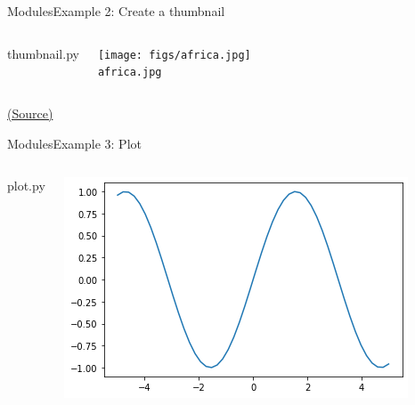\documentclass[10pt,compress]{beamer} %
\begin{document}
\begin{frame}[plain]{Modules}{Example 2: Create a thumbnail}
	\begin{columns}

		\vspace{-0.2cm}
		\begin{exampleblock}{thumbnail.py}
		\vspace{-0.2cm}
		
		\vspace{-0.2cm}
		\end{exampleblock}

		\vspace{-0.2cm}
		\centering \texttt{[image: figs/africa.jpg]}\\
	 	\texttt{africa.jpg}
	\end{columns}
		\vspace{-0.2cm}
	\centering \tiny{\href{http://www.pythonforbeginners.com/gui/how-to-use-pillow}{(Source)}}
\end{frame}

\begin{frame}{Modules}{Example 3: Plot}
	\begin{columns}
 	   \column{.60\textwidth}

		\vspace{-0.2cm}
		\begin{exampleblock}{plot.py}
		\vspace{-0.2cm}
		
		\vspace{-0.2cm}
		\end{exampleblock}

  		\column{.50\textwidth}
		\vspace{-0.2cm}
		\centering \includegraphics[width=\linewidth]{figs/plot.png}\\
	\end{columns}
		\vspace{-0.2cm}
\end{frame}
\end{document}

